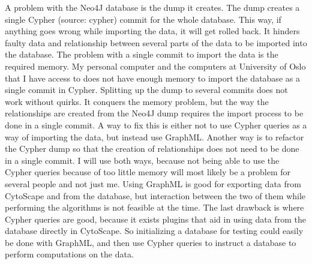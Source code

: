 A problem with the Neo4J database is the dump it creates. The dump creates a
single Cypher (source: cypher) commit for the whole database. This way, if
anything goes wrong while importing the data, it will get rolled back. It
hinders faulty data and relationship between several parts of the data to be
imported into the database. The problem with a single commit to import the data
is the required memory. My personal computer and the computers at University of
Oslo that I have access to does not have enough memory to import the database as
a single commit in Cypher. Splitting up the dump to several commits does not
work without quirks. It conquers the memory problem, but the way the
relationships are created from the Neo4J dump requires the import process to be
done in a single commit. A way to fix this is either not to use Cypher queries
as a way of importing the data, but instead use GraphML. Another way is to
refactor the Cypher dump so that the creation of relationships does not need to
be done in a single commit. I will use both ways, because not being able to use
the Cypher queries because of too little memory will most likely be a problem
for several people and not just me. Using GraphML is good for exporting data
from CytoScape and from the database, but interaction between the two of them
while performing the algorithms is not feasible at the time. The last drawback
is where Cypher queries are good, because it exists plugins that aid in using
data from the database directly in CytoScape. So initializing a database for
testing could easily be done with GraphML, and then use Cypher queries to
instruct a database to perform computations on the data.

